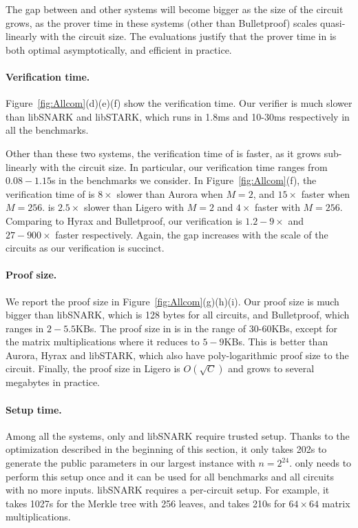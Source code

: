 The gap between \name and other systems will become bigger as the size of the circuit grows, as the prover time in these systems (other than Bulletproof) scales quasi-linearly with the circuit size. The evaluations justify that the prover time in \name is both optimal asymptotically, and efficient in practice.

\paragraph{Verification time.} Figure~\ref{fig:Allcom}(d)(e)(f) show the verification time. Our verifier is much slower than \textsf{libSNARK} and \textsf{libSTARK}, which runs in 1.8ms and 10-30ms respectively in all the benchmarks. 

Other than these two systems, the verification time of \name is faster, as it grows sub-linearly with the circuit size. In particular, our verification time ranges from $0.08-1.15$s in the benchmarks we consider. In Figure~\ref{fig:Allcom}(f), the verification time of \name is $8\times$ slower than \textsf{Aurora} when $M=2$, and $15\times$ faster when $M=256$. \name is $2.5\times$ slower than \textsf{Ligero} with $M=2$ and $4\times$ faster with $M=256$. Comparing to \textsf{Hyrax} and \textsf{Bulletproof}, our verification is $1.2-9\times$ and $27-900\times$ faster respectively. Again, the gap increases with the scale of the circuits as our verification is succinct.

\paragraph{Proof size.} We report the proof size in Figure~\ref{fig:Allcom}(g)(h)(i). Our proof size is much bigger than \textsf{libSNARK}, which is 128 bytes for all circuits, and \textsf{Bulletproof}, which ranges in $2-5.5$KBs. The proof size in \name is in the range of 30-60KBs, except for the matrix multiplications where it reduces to $5-9$KBs. This is better than \textsf{Aurora}, \textsf{Hyrax} and \textsf{libSTARK}, which also have poly-logarithmic proof size to the circuit. Finally, the proof size in \textsf{Ligero} is $O(\sqrt{C})$ and grows to several megabytes in practice.

\paragraph{Setup time.} Among all the systems, only \name and \textsf{libSNARK} require trusted setup. Thanks to the optimization described in the beginning of this section, it only takes 202s to generate the public parameters in our largest instance with $n = 2^{24}$. \name only needs to perform this setup once and it can be used for all benchmarks and all circuits with no more inputs. \textsf{libSNARK} requires a per-circuit setup. For example, it takes 1027s for the Merkle tree with 256 leaves, and takes 210s for $64\times 64$ matrix multiplications.

